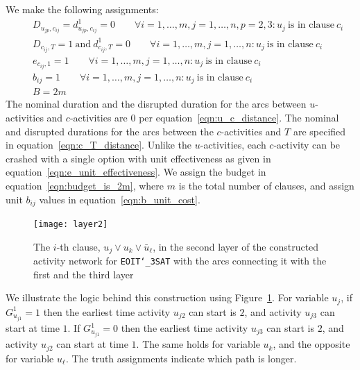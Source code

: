 \documentclass[11pt]{article}
\newcommand{\noi}{\noindent}
\newcommand{\tcr}{\textcolor{red}}
\begin{document}
	We make the following assignments:
	\begin{subequations}\label{eqn:EOIT_assignments}
	\begin{eqnarray}
	&& D_{u_{jp},c_{ij}}=d^1_{u_{jp},c_{ij}}=0 \qquad \forall i=1,\ldots,m, j=1,\ldots,n, p=2,3: u_j \ \mbox{is in clause} \ c_i \label{eqn:u_c_distance} \\
	&& D_{c_{ij},T}=1 \ \mbox{and} \ d^1_{c_{ij},T}=0 \qquad \forall i=1,\ldots,m, j=1,\ldots,n:  u_j \ \mbox{is in clause} \ c_i  \label{eqn:c_T_distance} \\
	&&e_{c_{ij},1} = 1 \qquad \forall i=1,\ldots,m, j=1,\ldots,n:  u_j \ \mbox{is in clause} \ c_i \label{eqn:e_unit_effectiveness} \\
	&& b_{ij}=1 \qquad \forall i=1,\ldots,m, j=1,\ldots,n:  u_j \ \mbox{is in clause} \ c_i \label{eqn:b_unit_cost} \\
	&& B=2m \label{eqn:budget_is_2m}
	\end{eqnarray}
	\end{subequations}
     The nominal duration and the disrupted duration for the arcs between \(u\)-activities and \(c\)-activities are \(0\) per equation~\eqref{eqn:u_c_distance}. The nominal and disrupted durations for the arcs between the \(c\)-activities and \(T\) are specified in equation~\eqref{eqn:c_T_distance}. Unlike the \(u\)-activities, each \(c\)-activity can be crashed with a single option with unit effectiveness as given in equation~\eqref{eqn:e_unit_effectiveness}. We assign the budget in equation~\eqref{eqn:budget_is_2m}, where \(m\) is the total number of clauses, and assign unit $b_{ij}$ values in equation~\eqref{eqn:b_unit_cost}.
	\begin{figure}
		\centering
		\texttt{[image: layer2]}
		\caption{The \(i\)-th clause, \(u_{j} \vee u_{k} \vee \bar{u}_{\ell}\), in the second layer of the constructed activity network for \texttt{EOIT\char`_3SAT} with the arcs connecting it with the first and the third layer}
		\label{fig:layer2}
	\end{figure}
	\noi We illustrate the logic behind this construction using Figure~\ref{fig:layer2}. For variable \(u_j\), if \(G^1_{u_{j1}} = 1\) then the earliest time activity \(u_{j2}\) can start is \(2\), and activity \(u_{j3}\) can start at time \(1\). If \(G^1_{u_{j1}} = 0\) then the earliest time activity \(u_{j3}\) can start is \(2\), and activity \(u_{j2}\) can start at time \(1\). The same holds for variable \(u_k\), and the opposite for variable \(u_\ell\). The truth assignments indicate which path is longer.
	
\end{document}
